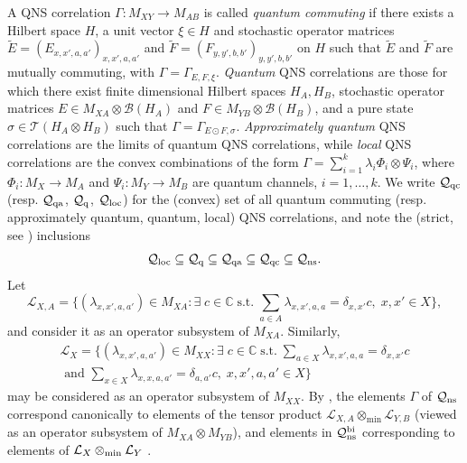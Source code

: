 \documentclass[11pt]{amsart}
\newcommand{\cl}[1]{\mathcal{#1}}
\newcommand{\bb}[1]{\mathbb{#1}}
\begin{document}
A QNS correlation $\Gamma: M_{XY}\rightarrow M_{AB}$ is called 
\emph{quantum commuting} if there exists a Hilbert space $H$, a unit vector $\xi \in H$ and stochastic operator matrices $\tilde{E} = (E_{x, x', a, a'})_{x, x', a, a'}$ and $\tilde{F} = (F_{y, y', b, b'})_{y, y', b, b'}$ on $H$ such that $\tilde{E}$ and $\tilde{F}$ are mutually commuting, with $\Gamma = \Gamma_{E, F, \xi}$. 
\emph{Quantum} QNS correlations are those for which there exist finite dimensional Hilbert spaces $H_{A}, H_{B}$, stochastic operator matrices $E \in M_{XA}\otimes \cl{B}(H_{A})$ and $F \in M_{YB}\otimes \cl{B}(H_{B})$, and a pure state $\sigma \in \cl{T}(H_{A}\otimes H_{B})$ such that $\Gamma = \Gamma_{E\odot F, \sigma}$. 
\emph{Approximately quantum} QNS correlations are the 
limits of quantum QNS correlations, while \emph{local} QNS correlations are 
the convex combinations of the form 
$\Gamma = \sum_{i=1}^k \lambda_i \Phi_i \otimes \Psi_i$, 
where $\Phi_i : M_X\to M_A$ and $\Psi_i : M_Y\to M_B$ are quantum channels, $i = 1,\dots,k$.
We write $\cl Q_{\rm qc}$ (resp. $\cl Q_{\rm qa}$, $\cl Q_{\rm q}$, $\cl Q_{\rm loc}$) for the (convex) set of all quantum commuting (resp. approximately quantum, quantum, local) QNS correlations, and note the (strict, see \cite{tt})
inclusions 
\begin{equation}\label{eq_Qinc}
\cl Q_{\rm loc}\subseteq \cl Q_{\rm q}\subseteq \cl Q_{\rm qa}\subseteq \cl Q_{\rm qc}\subseteq \cl Q_{\rm ns}.
\end{equation}
Let
$$	\cl{L}_{X, A} = \bigg\{(\lambda_{x, x', a, a'}) \in M_{XA} :  \exists \;c \in \bb{C} \;\text{s.t.} \;
	\sum_{a\in A}\lambda_{x, x', a, a} = \delta_{x, x'}c, \; x, x' \in X\bigg\},$$
and consider it as an operator subsystem of $M_{XA}$. Similarly, 
\begin{gather*}
	\cl{L}_{X} = \bigg\{(\lambda_{x, x', a, a'}) \in M_{XX} : \exists \; c \in \bb{C} \; \text{s.t.} \;
	\sum_{a \in X}\lambda_{x, x', a, a} = \delta_{x, x'}c \\ \text{ and } \sum_{x \in X}\lambda_{x, x, a, a'} = \delta_{a, a'}c, \; x, x', a, a' \in X\bigg\}
\end{gather*}
\noindent may be considered as an operator subsystem of $M_{XX}$. By \cite[Proposition 5.5, Theorem 6.2]{tt}, the elements $\Gamma$ of $\cl Q_{\rm ns}$ 
correspond canonically to elements of the tensor product  $\cl{L}_{X, A}\otimes_{\min} \cl L_{Y,B}$
(viewed as an operator subsystem of $M_{XA}\otimes M_{YB}$), and elements in $\cl{Q}_{\rm ns}^{\rm bi}$ corresponding to elements of $\cl{L}_{X}\otimes_{\rm min} \cl{L}_{Y}$ \cite[Proposition 3.6, Theorem 5.4]{bhtt}.
\end{document}
